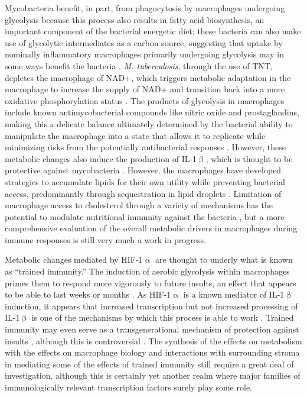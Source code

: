Mycobacteria benefit, in part, from phagocytosis by macrophages undergoing glycolysis because this process also results in fatty acid biosynthesis, an important component of the bacterial energetic diet; these bacteria can also make use of glycolytic intermediates as a carbon source, suggesting that uptake by nominally inflammatory macrophages primarily undergoing glycolysis may in some ways benefit the bacteria \citep{Escoll2019}. \textit{M. tuberculosis}, through the use of TNT, depletes the macrophage of NAD+, which triggers metabolic adaptation in the macrophage to increase the supply of NAD+ and transition back into a more oxidative phosphorylation status \citep{Howard2020}. The products of glycolysis in macrophages include known antimycobacterial compounds like nitric oxide and prostaglandins, making this a delicate balance ultimately determined by the bacterial ability to manipulate the macrophage into a state that allows it to replicate while minimizing risks from the potentially antibacterial responses \citep{OsadaOka2019}. However, these metabolic changes also induce the production of IL-1$\upbeta$, which is thought to be protective against mycobacteria \citep{Corcoran2016, Ogryzko2019, Fremond2007}. However, the macrophages have developed strategies to accumulate lipids for their own utility while preventing bacterial access, predominantly through sequestration in lipid droplets \citep{Laval2021}. Limitation of macrophage access to cholesterol through a variety of mechanisms has the potential to modulate nutritional immunity against the bacteria \citep{Babunovic2022, Pandey2008, Yang2014c}, but a more comprehensive evaluation of the overall metabolic drivers in macrophages during immune responses is still very much a work in progress.

Metabolic changes mediated by HIF-1$\upalpha$ are thought to underly what is known as ``trained immunity.'' The induction of aerobic glycolysis within macrophages primes them to respond more vigorously to future insults, an effect that appears to be able to last weeks or months \citep{Cheng2014}. As HIF-1$\upalpha$ is a known mediator of IL-1$\upbeta$ induction, it appears that increased transcription but not increased processing of IL-1$\upbeta$ is one of the mechanisms by which this process is able to work \citep{Arts2018}. Trained immunity may even serve as a transgenerational mechanism of protection against insults \citep{Katzmarski2021}, although this is controversial \citep{Kaufmann2022, Katzmarski2022}. The synthesis of the effects on metabolism with the effects on macrophage biology and interactions with surrounding stroma in mediating some of the effects of trained immunity still require a great deal of investigation, although this is certainly yet another realm where major families of immunologically relevant transcription factors surely play some role. 
 
